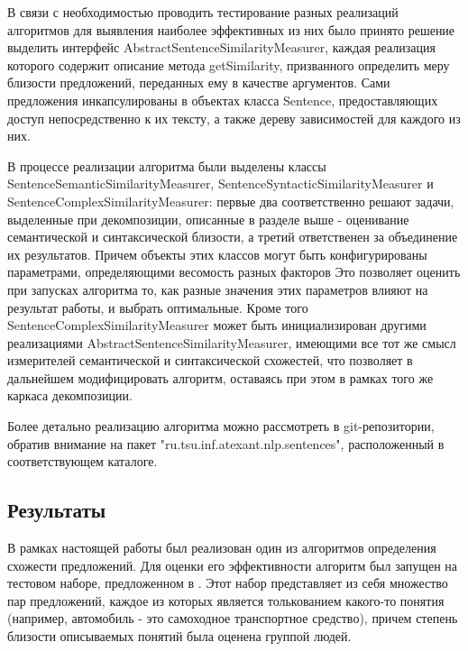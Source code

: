 

В связи с необходимостью проводить тестирование разных реализаций алгоритмов
для выявления наиболее эффективных из них было принято решение выделить интерфейс
AbstractSentenceSimilarityMeasurer, каждая реализация которого содержит описание метода getSimilarity,
призванного определить меру близости предложений, переданных ему в качестве аргументов.
Сами предложения инкапсулированы в объектах класса Sentence, предоставляющих доступ
непосредственно к их тексту, а также дереву зависимостей для каждого из них.


В процессе реализации алгоритма были выделены классы SentenceSemanticSimilarityMeasurer,
SentenceSyntacticSimilarityMeasurer и SentenceComplexSimilarityMeasurer:
первые два соответственно решают задачи, выделенные при декомпозиции, описанные
в разделе выше - оценивание семантической и синтаксической близости,
а третий ответственен за объединение их результатов. Причем объекты этих классов
могут быть конфигурированы параметрами, определяющими весомость разных факторов
Это позволяет оценить при запусках алгоритма то, как разные значения этих параметров влияют на результат работы,
и выбрать оптимальные. Кроме того SentenceComplexSimilarityMeasurer может быть инициализирован 
другими реализациями AbstractSentenceSimilarityMeasurer, имеющими все тот же смысл
измерителей семантической и синтаксической схожестей, что позволяет в дальнейшем модифицировать алгоритм,
оставаясь при этом в рамках того же каркаса декомпозиции. 

Более детально реализацию алгоритма можно рассмотреть в git-репозитории\cite{github},
обратив внимание на пакет "ru.tsu.inf.atexant.nlp.sentences",
расположенный в соответствующем каталоге.

\subsection{Результаты}
В рамках настоящей работы был реализован один из алгоритмов определения схожести предложений.
Для оценки его эффективности алгоритм был запущен на тестовом наборе,
предложенном в \cite{complexSim}. Этот набор представляет из себя множество пар предложений,
каждое из которых является толькованием какого-то понятия (например, автомобиль - это самоходное транспортное средство),
причем степень близости описываемых понятий была оценена группой людей.

